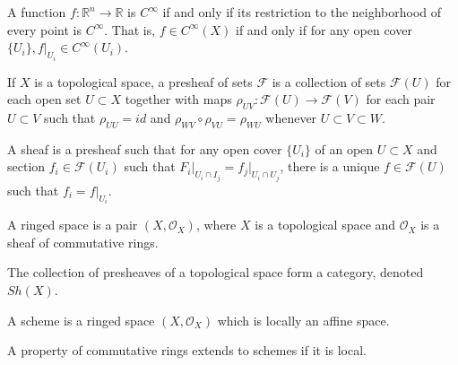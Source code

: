\documentclass[crop=false,class=book]{standalone}
\begin{document}
A function $f:\mathbb{R}^n \rightarrow \mathbb{R}$ is $C^{\infty}$ if and only if its restriction to the neighborhood of every point is $C^{\infty}$. That is, $f\in C^{\infty}(X)$ if and only if for any open cover $\{U_i\},f\big|_{U_i}\in C^{\infty}(U_i)$.
\begin{definition}
If $X$ is a topological space, a presheaf of sets $\mathcal{F}$ is a collection of sets $\mathcal{F}(U)$ for each open set $U\subset X$ together with maps $\rho_{UV}:\mathcal{F}(U)\rightarrow \mathcal{F}(V)$ for each pair $U\subset V$ such that $\rho_{UU} = id$ and $\rho_{WV}\circ \rho_{VU} = \rho_{WU}$ whenever $U\subset V \subset W$.
\end{definition}
\begin{definition}
A sheaf is a presheaf such that for any open cover $\{U_i\}$ of an open $U\subset X$ and section $f_i \in \mathcal{F}(U_i)$ such that $F_i\big|_{U_i\cap I_j} = f_j\big|_{U_i\cap U_j}$, there is a unique $f\in \mathcal{F}(U)$ such that $f_i = f\big|_{U_i}$.
\end{definition}
\begin{definition}
A ringed space is a pair $(X,\mathcal{O}_X)$, where $X$ is a topological space and $\mathcal{O}_X$ is a sheaf of commutative rings.
\end{definition}
The collection of presheaves of a topological space form a category, denoted $Sh(X)$. 
\begin{definition}
A scheme is a ringed space $(X,\mathcal{O}_X)$ which is locally an affine space.
\end{definition}
\begin{theorem}
A property of commutative rings extends to schemes if it is local.
\end{theorem}
\end{document}
